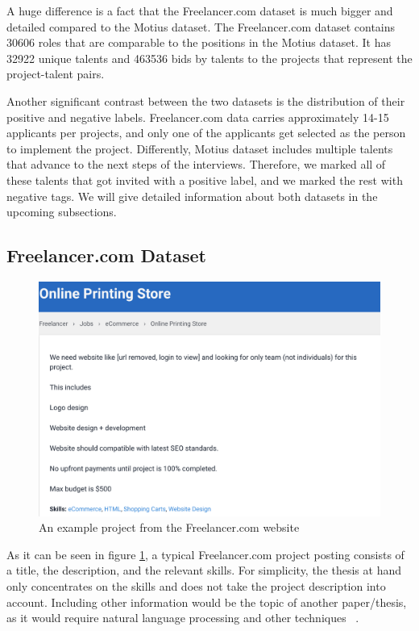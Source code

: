 A huge difference is a fact that the Freelancer.com dataset is much bigger and detailed compared to the Motius dataset. The Freelancer.com dataset contains 30606 roles that are comparable to the positions in the Motius dataset. It has 32922 unique talents and 463536 bids by talents to the projects that represent the project-talent pairs.



Another significant contrast between the two datasets is the distribution of their positive and negative labels. Freelancer.com data carries approximately 14-15 applicants per projects, and only one of the applicants get selected as the person to implement the project. Differently,  Motius dataset includes multiple talents that advance to the next steps of the interviews. Therefore, we marked all of these talents that got invited with a positive label, and we marked the rest with negative tags. We will give detailed information about both datasets in the upcoming subsections.


\subsection{Freelancer.com Dataset}\label{implementation-subsection-freelancer}


\begin{figure}[htp]
	\centering
	\includegraphics[width=\textwidth]{figures/FreelancerExample.png}
	\caption{An example project from the Freelancer.com website}
	\label{fig:freelancer-example-project}
\end{figure}


As it can be seen in figure \ref{fig:freelancer-example-project}, a typical Freelancer.com project posting consists of a title, the description, and the relevant skills. For simplicity, the thesis at hand only concentrates on the skills and does not take the project description into account. Including other information would be the topic of another paper/thesis, as it would require natural language processing and other techniques ~\parencite{bird2009natural}.


